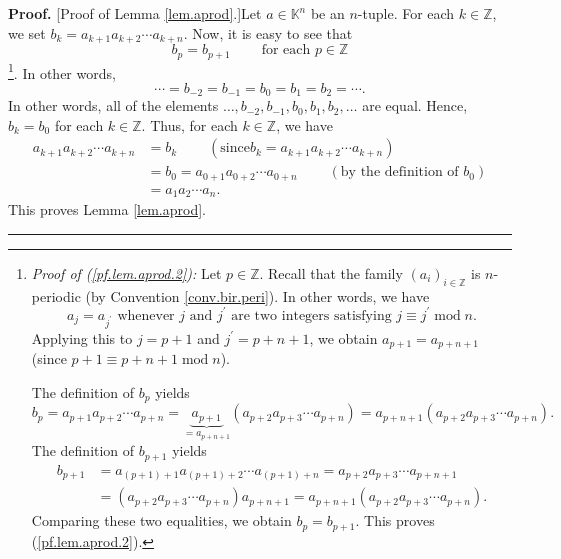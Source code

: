 \documentclass[numbers=enddot,12pt,final,onecolumn,notitlepage]{scrartcl}%
\theoremstyle{definition}
\newenvironment{proof}[1][Proof]{\noindent\textbf{#1.} }{\ \rule{0.5em}{0.5em}}
\newenvironment{verlong}{}{}
\begin{document}
\begin{verlong}
\begin{proof}
[Proof of Lemma \ref{lem.aprod}.]Let $a\in\mathbb{K}^{n}$ be an $n$-tuple. For
each $k\in\mathbb{Z}$, we set $b_{k}=a_{k+1}a_{k+2}\cdots a_{k+n}$. Now, it is
easy to see that%
\begin{equation}
b_{p}=b_{p+1}\ \ \ \ \ \ \ \ \ \ \text{for each }p\in\mathbb{Z}
\label{pf.lem.aprod.2}%
\end{equation}
\footnote{\textit{Proof of (\ref{pf.lem.aprod.2}):} Let $p\in\mathbb{Z}$.
Recall that the family $\left(  a_{i}\right)  _{i\in\mathbb{Z}}$ is
$n$-periodic (by Convention \ref{conv.bir.peri}). In other words, we have%
\[
a_{j}=a_{j^{\prime}}\text{ whenever }j\text{ and }j^{\prime}\text{ are two
integers satisfying }j\equiv j^{\prime}\operatorname{mod}n.
\]
Applying this to $j=p+1$ and $j^{\prime}=p+n+1$, we obtain $a_{p+1}=a_{p+n+1}$
(since $p+1\equiv p+n+1\operatorname{mod}n$).
\par
The definition of $b_{p}$ yields
\[
b_{p}=a_{p+1}a_{p+2}\cdots a_{p+n}=\underbrace{a_{p+1}}_{=a_{p+n+1}}\left(
a_{p+2}a_{p+3}\cdots a_{p+n}\right)  =a_{p+n+1}\left(  a_{p+2}a_{p+3}\cdots
a_{p+n}\right)  .
\]
The definition of $b_{p+1}$ yields%
\begin{align*}
b_{p+1}  &  =a_{\left(  p+1\right)  +1}a_{\left(  p+1\right)  +2}\cdots
a_{\left(  p+1\right)  +n}=a_{p+2}a_{p+3}\cdots a_{p+n+1}\\
&  =\left(  a_{p+2}a_{p+3}\cdots a_{p+n}\right)  a_{p+n+1}=a_{p+n+1}\left(
a_{p+2}a_{p+3}\cdots a_{p+n}\right)  .
\end{align*}
Comparing these two equalities, we obtain $b_{p}=b_{p+1}$. This proves
(\ref{pf.lem.aprod.2}).}. In other words,%
\[
\cdots=b_{-2}=b_{-1}=b_{0}=b_{1}=b_{2}=\cdots.
\]
In other words, all of the elements $\ldots,b_{-2},b_{-1},b_{0},b_{1}%
,b_{2},\ldots$ are equal. Hence, $b_{k}=b_{0}$ for each $k\in\mathbb{Z}$.
Thus, for each $k\in\mathbb{Z}$, we have%
\begin{align*}
a_{k+1}a_{k+2}\cdots a_{k+n}  &  =b_{k}\ \ \ \ \ \ \ \ \ \ \left(  \text{since
}b_{k}=a_{k+1}a_{k+2}\cdots a_{k+n}\right) \\
&  =b_{0}=a_{0+1}a_{0+2}\cdots a_{0+n}\ \ \ \ \ \ \ \ \ \ \left(  \text{by the
definition of }b_{0}\right) \\
&  =a_{1}a_{2}\cdots a_{n}.
\end{align*}
This proves Lemma \ref{lem.aprod}.
\end{proof}
\end{verlong}
\end{document}
